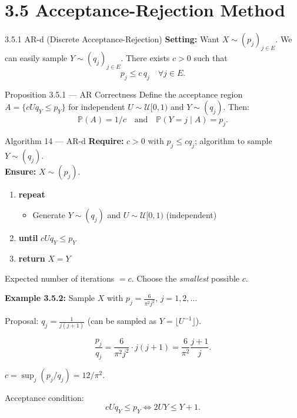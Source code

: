 \documentclass[aspectratio=169,10pt]{beamer}
\newcommand{\PP}{\mathbb{P}}
\newcommand{\UU}{\mathcal{U}}
\begin{document}
\section{3.5 Acceptance-Rejection Method}

\begin{frame}[allowframebreaks]{3.5.1 AR-d (Discrete Acceptance-Rejection)}
  \textbf{Setting:} Want $X\sim(p_j)_{j\in E}$.  We can easily sample $Y\sim(q_j)_{j\in E}$.
  There exists $c>0$ such that
  \[
    p_j \le c\,q_j \quad \forall j\in E.
  \]

  \begin{block}{Proposition 3.5.1 --- AR Correctness}
    Define the acceptance region $A = \{cUq_Y \le p_Y\}$ for independent
    $U\sim\UU[0,1)$ and $Y\sim(q_j)$.  Then:
    \[
      \PP(A) = 1/c \quad\text{and}\quad \PP(Y=j\mid A) = p_j.
    \]
  \end{block}

  \begin{alertblock}{Algorithm 14 --- AR-d}
    \textbf{Require:} $c>0$ with $p_j\le cq_j$; algorithm to sample $Y\sim(q_j)$.\\
    \textbf{Ensure:} $X\sim(p_j)$.
    \begin{enumerate}
      \item \textbf{repeat}
      \begin{itemize}
        \item Generate $Y\sim(q_j)$ and $U\sim\UU[0,1)$ (independent)
      \end{itemize}
      \item \textbf{until} $cUq_Y \le p_Y$
      \item \textbf{return} $X=Y$
    \end{enumerate}
    Expected number of iterations $= c$.  Choose the \emph{smallest} possible $c$.
  \end{alertblock}

  \framebreak

  \textbf{Example 3.5.2:} Sample $X$ with $p_j = \frac{6}{\pi^2 j^2}$, $j=1,2,\ldots$

  Proposal: $q_j = \frac{1}{j(j+1)}$ (can be sampled as $Y=\lfloor U^{-1}\rfloor$).

  \[
    \frac{p_j}{q_j} = \frac{6}{\pi^2 j^2} \cdot j(j+1) = \frac{6}{\pi^2}\frac{j+1}{j}.
  \]

  $c = \sup_j(p_j/q_j) = 12/\pi^2$.

  \medskip
  Acceptance condition:
  \[
    cUq_Y \le p_Y \iff 2UY \le Y+1.
  \]
\end{frame}
\end{document}
